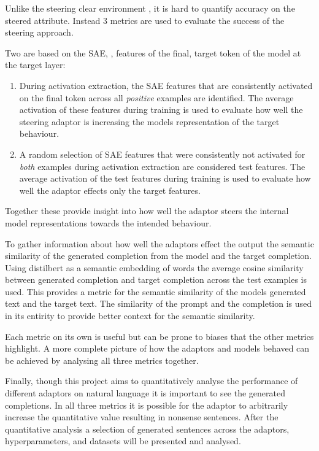  Unlike the steering clear environment , it is hard to quantify accuracy on the steered attribute.
Instead 3 metrics are used to evaluate the success of the steering approach.

Two are based on the SAE, , features of the final, target token of the model at the target layer:
\begin{enumerate}[nolistsep]
    \item During activation extraction, the SAE features that are consistently activated on the final token across all \emph{positive} examples are identified.
        The average activation of these features during training is used to evaluate how well the steering adaptor is increasing the models representation of the target behaviour.
    \item A random selection of SAE features that were consistently not activated for \emph{both} examples during activation extraction are considered test features.
        The average activation of the test features during training is used to evaluate how well the adaptor effects only the target features.
\end{enumerate}
Together these provide insight into how well the adaptor steers the internal model representations towards the intended behaviour.

To gather information about how well the adaptors effect the output the semantic similarity of the generated completion from the model and the target completion.
Using distilbert \citep{distilbert} as a semantic embedding of words the average cosine similarity between generated completion and target completion across the test examples is used.
This provides a metric for the semantic similarity of the models generated text and the target text.
The similarity of the prompt and the completion is used in its entirity to provide better context for the semantic similarity.

Each metric on its own is useful but can be prone to biases that the other metrics highlight.
A more complete picture of how the adaptors and models behaved can be achieved by analysing all three metrics together.

Finally, though this project aims to quantitatively analyse the performance of different adaptors on natural language it is important to see the generated completions.
In all three metrics it is possible for the adaptor to arbitrarily increase the quantitative value resulting in nonsense sentences.
After the quantitative analysis a selection of generated sentences across the adaptors, hyperparameters, and datasets will be presented and analysed.


